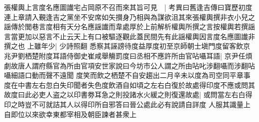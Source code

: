 張權輿上言度名應圖䜟宅占岡原不召而來其旨可見　|{
	考異曰舊逢吉傳曰寶歷初度連上章請入覲逢吉之黨坐不安席如矢攅身乃相與為謀欲沮其來張權輿撰非衣小兒之謡傳於閭巷言度相有天分名應謡䜟而韋處厚於上前解析權輿所撰之言按權輿若撰謡言當更加以惡言不止云天上有口被驅逐觀此蓋民間先有此謡權輿因言度名應圖䜟非撰之也}
上雖年少|{
	少詩照翻}
悉察其誣謗待度益厚度初至京師朝士塡門度留客飲京兆尹劉栖楚附度耳語侍御史崔咸舉觴罰度曰丞相不應許所由官呫囁耳語|{
	京尹任煩劇故唐人謂府縣官為所由官項安世家說曰今坊市公人謂之所由呫叱涉翻囁而涉翻呫囁細語口動而聲不遠聞}
度笑而飲之栖楚不自安趨出二月辛未以度為司空同平章事度在中書左右忽白失印聞者失色度飲酒自如頃之左右白復於故處得印度不應或問其故度曰此必吏人盗之以印書劵耳急之則投諸水火緩之則復還故處|{
	或問當左右白得印之時豈不可就詰其人以得印所自邪答曰晉公處此必有說請自詳度}
人服其識量上自即位以來欲幸東都宰相及朝臣諫者甚衆上


